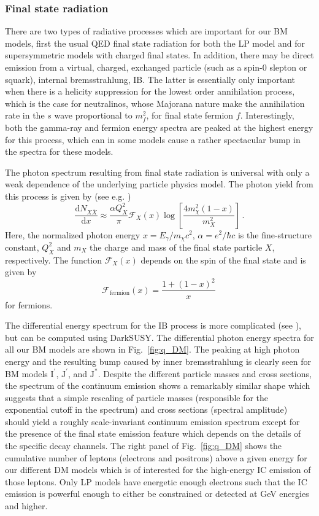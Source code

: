 \documentclass[10pt,aps,pra,reprint,amsmath,amsfonts,amssymb,showpacs,nofootinbib,floatfix]{revtex4-1}
\newcommand{\rmn}{\mathrm}
\newcommand{\Ip}{\rmn{I}^\prime}
\newcommand{\Js}{\rmn{J}^*}
\newcommand{\Jp}{\rmn{J}^\prime}
\newcommand{\dd}{\rmn{d}}
\newcommand{\eg}{E_\gamma}
\begin{document}
\subsubsection{Final state radiation}
There are two types of radiative processes which are important for our
BM models, first the usual QED final state radiation for both the LP
model and for supersymmetric models with charged final states. In
addition, there may be direct emission from a virtual, charged,
exchanged particle (such as a spin-0 slepton or squark), internal
bremsstrahlung, IB. The latter is essentially only important when
there is a helicity suppression for the lowest order annihilation
process, which is the case for neutralinos, whose Majorana nature make
the annihilation rate in the $s$ wave proportional to $m_f^2$, for
final state fermion $f$. Interestingly, both the gamma-ray and fermion
energy spectra are peaked at the highest energy for this process,
which can in some models cause a rather spectacular bump in the
spectra for these models.

The photon spectrum resulting from final state radiation is universal
with only a weak dependence of the underlying particle physics
model. The photon yield from this process is given by (see
e.g. \cite{2008JHEP...01..049B})
\begin{equation}
\frac{\dd N_{X \bar{X}}}{\dd x} \approx \frac{\alpha Q_X^2}{\pi}
\mathcal{F}_X(x) \log\left[\frac{4 m_\chi^2\left(1-x\right)}{m_X^2}\right]\,.
\end{equation}
Here, the normalized photon energy $x=\eg/m_\chi c^2$, 
$\alpha =e^2/\hbar c$ is the fine-structure constant, 
$Q_X^2$ and $m_X$ the
charge and mass of the final state particle $X$, respectively. The function
$\mathcal{F}_X(x)$ depends on the spin of the final state and is given
by
\begin{equation}
\mathcal{F}_\rmn{fermion}(x) = \frac{1+\left(1-x\right)^2}{x}\,
\end{equation}
for fermions. 

The differential energy spectrum for the IB process is more
complicated (see \cite{1989PhLB..225..372B,2008JHEP...01..049B}), but
can be computed using {\sc DarkSUSY}. The differential photon energy
spectra for all our BM models are shown in Fig.~\ref{fig:q_DM}.  The
peaking at high photon energy and the resulting bump caused by inner
bremsstrahlung is clearly seen for BM models $\Ip$, $\Jp$, and
$\Js$. Despite the different particle masses and cross sections, the
spectrum of the continuum emission shows a remarkably similar shape
which suggests that a simple rescaling of particle masses (responsible
for the exponential cutoff in the spectrum) and cross sections
(spectral amplitude) should yield a roughly scale-invariant continuum
emission spectrum except for the presence of the final state emission
feature which depends on the details of the specific decay
channels. The right panel of Fig.~\ref{fig:q_DM} shows the cumulative
number of leptons (electrons and positrons) above a given energy for
our different DM models which is of interested for the high-energy IC
emission of those leptons. Only LP models have energetic enough
electrons such that the IC emission is powerful enough to either be
constrained or detected at GeV energies and higher.
\end{document}
